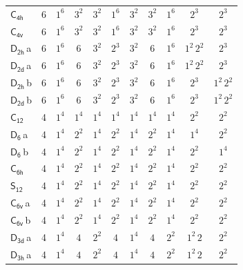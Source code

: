\documentclass[10pt,a4paper]{article}
\numberwithin{equation}{section}
\newcommand{\grp}[1]{\mathsf{#1}}
\newcommand{\clsletter}[1]{\,{\scriptsize\color{black!55}#1}}
\begin{document}
{\begin{longtable}{@{}lrccccccccc@{}}
\href{C4h.pdf}{$\grp{C_{4h}}$} & 6 & $1^{6}$ & $3^{2}$ & $3^{2}$ & $1^{6}$ & $3^{2}$ & $3^{2}$ & $1^{6}$ & $2^{3}$ & $2^{3}$\\
\href{C4v.pdf}{$\grp{C_{4v}}$} & 6 & $1^{6}$ & $3^{2}$ & $3^{2}$ & $1^{6}$ & $3^{2}$ & $3^{2}$ & $1^{6}$ & $2^{3}$ & $2^{3}$\\
\href{D2h.pdf}{$\grp{D_{2h}}$}\clsletter{a} & 6 & $1^{6}$ & $6$ & $3^{2}$ & $2^{3}$ & $3^{2}$ & $6$ & $1^{6}$ & $1^{2}\,2^{2}$ & $2^{3}$\\
\href{D2d.pdf}{$\grp{D_{2d}}$}\clsletter{a} & 6 & $1^{6}$ & $6$ & $3^{2}$ & $2^{3}$ & $3^{2}$ & $6$ & $1^{6}$ & $1^{2}\,2^{2}$ & $2^{3}$\\
\href{D2h.pdf}{$\grp{D_{2h}}$}\clsletter{b} & 6 & $1^{6}$ & $6$ & $3^{2}$ & $2^{3}$ & $3^{2}$ & $6$ & $1^{6}$ & $2^{3}$ & $1^{2}\,2^{2}$\\
\href{D2d.pdf}{$\grp{D_{2d}}$}\clsletter{b} & 6 & $1^{6}$ & $6$ & $3^{2}$ & $2^{3}$ & $3^{2}$ & $6$ & $1^{6}$ & $2^{3}$ & $1^{2}\,2^{2}$\\
\href{C12.pdf}{$\grp{C_{12}}$} & 4 & $1^{4}$ & $1^{4}$ & $1^{4}$ & $1^{4}$ & $1^{4}$ & $1^{4}$ & $1^{4}$ & $2^{2}$ & $2^{2}$\\
\href{D6.pdf}{$\grp{D_{6}}$}\clsletter{a} & 4 & $1^{4}$ & $2^{2}$ & $1^{4}$ & $2^{2}$ & $1^{4}$ & $2^{2}$ & $1^{4}$ & $1^{4}$ & $2^{2}$\\
\href{D6.pdf}{$\grp{D_{6}}$}\clsletter{b} & 4 & $1^{4}$ & $2^{2}$ & $1^{4}$ & $2^{2}$ & $1^{4}$ & $2^{2}$ & $1^{4}$ & $2^{2}$ & $1^{4}$\\
\href{C6h.pdf}{$\grp{C_{6h}}$} & 4 & $1^{4}$ & $2^{2}$ & $1^{4}$ & $2^{2}$ & $1^{4}$ & $2^{2}$ & $1^{4}$ & $2^{2}$ & $2^{2}$\\
\href{S12.pdf}{$\grp{S_{12}}$} & 4 & $1^{4}$ & $2^{2}$ & $1^{4}$ & $2^{2}$ & $1^{4}$ & $2^{2}$ & $1^{4}$ & $2^{2}$ & $2^{2}$\\
\href{C6v.pdf}{$\grp{C_{6v}}$}\clsletter{a} & 4 & $1^{4}$ & $2^{2}$ & $1^{4}$ & $2^{2}$ & $1^{4}$ & $2^{2}$ & $1^{4}$ & $2^{2}$ & $2^{2}$\\
\href{C6v.pdf}{$\grp{C_{6v}}$}\clsletter{b} & 4 & $1^{4}$ & $2^{2}$ & $1^{4}$ & $2^{2}$ & $1^{4}$ & $2^{2}$ & $1^{4}$ & $2^{2}$ & $2^{2}$\\
\href{D3d.pdf}{$\grp{D_{3d}}$}\clsletter{a} & 4 & $1^{4}$ & $4$ & $2^{2}$ & $4$ & $1^{4}$ & $4$ & $2^{2}$ & $1^{2}\,2$ & $2^{2}$\\
\href{D3h.pdf}{$\grp{D_{3h}}$}\clsletter{a} & 4 & $1^{4}$ & $4$ & $2^{2}$ & $4$ & $1^{4}$ & $4$ & $2^{2}$ & $1^{2}\,2$ & $2^{2}$\\

\end{longtable}}
\end{document}
